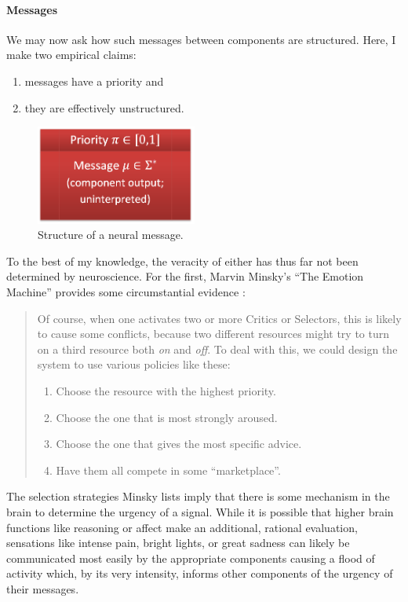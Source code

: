 \documentclass[]{scrartcl}
\theoremstyle{break}
\begin{document}
\pagebreak

\paragraph{Messages}

We may now ask how such messages between components are structured. Here, I make two empirical claims:
\begin{enumerate}
	\item messages have a priority and
	\item they are effectively unstructured.
\end{enumerate}

\begin{figure}[!h]
	\centering
	\includegraphics[width=150pt]{figs/message.png}
	\caption{Structure of a neural message.}
	\label{fig:message}
\end{figure}

To the best of my knowledge, the veracity of either has thus far not been determined by neuroscience. For the first, Marvin Minsky's ``The Emotion Machine'' provides some circumstantial evidence \cite[p. 222]{emotionMachine}:

\begin{quote}
	Of course, when one activates two or more Critics or Selectors, this is likely to cause some conflicts, because two different resources might try to turn on a third resource both {\em on} and {\em off}. To deal with this, we could design the system to use various policies like these:
	
	\begin{enumerate}
		\item Choose the resource with the highest priority.
		\item Choose the one that is most strongly aroused.
		\item Choose the one that gives the most specific advice.
		\item Have them all compete in some ``marketplace''.
	\end{enumerate}
\end{quote}

The selection strategies Minsky lists imply that there is some mechanism in the brain to determine the urgency of a signal. While it is possible that higher brain functions like reasoning or affect make an additional, rational evaluation, sensations like intense pain, bright lights, or great sadness can likely be communicated most easily by the appropriate components causing a flood of activity which, by its very intensity, informs other components of the urgency of their messages.
\end{document}
